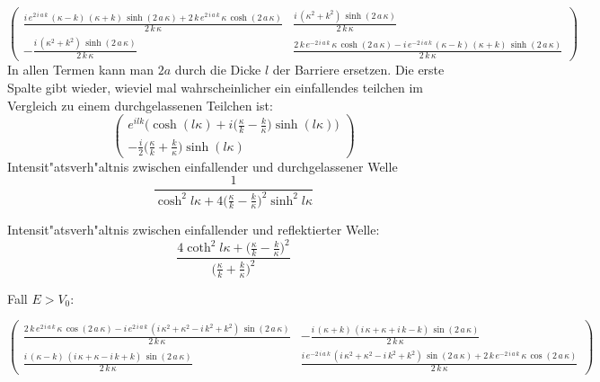 
\[
\begin{pmatrix}
\frac{i\,e^{2\,i\,a\,k}\,\left(\kappa-k\right)\,\left(\kappa+k
 \right)\,\sinh \left(2\,a\,\kappa\right)+2\,k\,e^{2\,i\,a\,k}\,
 \kappa\,\cosh \left(2\,a\,\kappa\right)}{2\,k\,\kappa}
&
\frac{i\,
 \left(\kappa^2+k^2\right)\,\sinh \left(2\,a\,\kappa\right)}{2\,
 k\,\kappa}
\\
-\frac{i\,\left(\kappa^2+k^2\right)\,\sinh \left(2\,a\,
 \kappa\right)}{2\,k\,\kappa}
&
\frac{2\,k\,e^ {- 2\,i\,a\,k }\,
 \kappa\,\cosh \left(2\,a\,\kappa\right)-i\,e^ {- 2\,i\,a\,k }\,
 \left(\kappa-k\right)\,\left(\kappa+k\right)\,\sinh \left(2\,a\,
 \kappa\right)}{2\,k\,\kappa}
\end{pmatrix}
\]
In allen Termen kann man $2a$ durch die Dicke $l$ der Barriere ersetzen.
Die erste Spalte gibt wieder, wieviel mal wahrscheinlicher ein einfallendes
teilchen im Vergleich zu einem durchgelassenen Teilchen ist:
\[
\begin{pmatrix}
\displaystyle
e^{ilk}\biggl(\cosh(l\kappa)
+i\biggl(\frac{\kappa}{k}-\frac{k}{\kappa}\biggr)\sinh(l\kappa)
\biggr)
\\
\displaystyle
- \frac{i}{2}
\biggl(\frac{\kappa}{k}+\frac{k}{\kappa}\biggr)
\sinh(l\kappa)
\end{pmatrix}
\]
Intensit"atsverh"altnis zwischen einfallender und durchgelassener
Welle
\[
\frac{1}{
\displaystyle
\cosh^2 l\kappa 
+
4\biggl(\displaystyle\frac{\kappa}{k}-\frac{k}{\kappa}\biggr)^2\sinh^2l\kappa
}
\]

Intensit"atsverh"altnis zwischen einfallender und reflektierter
Welle:
\[
\frac{
4\coth^2l\kappa + \biggl(\displaystyle\frac{\kappa}{k}-\frac{k}{\kappa}\biggr)^2
}{
\biggl(\displaystyle\frac{\kappa}{k}+\frac{k}{\kappa}\biggr)^2
}
\]

Fall $E>V_0$:

\[
\begin{pmatrix}
\frac{2\,k\,e^{2\,i\,a\,k}\,\kappa\,\cos \left(2\,a\,\kappa
 \right)-i\,e^{2\,i\,a\,k}\,\left(i\,\kappa^2+\kappa^2-i\,k^2+k^2
 \right)\,\sin \left(2\,a\,\kappa\right)}{2\,k\,\kappa}
&
-\frac{i\,
 \left(\kappa+k\right)\,\left(i\,\kappa+\kappa+i\,k-k\right)\,\sin 
 \left(2\,a\,\kappa\right)}{2\,k\,\kappa}
\\
\frac{i\,\left(\kappa-
 k\right)\,\left(i\,\kappa+\kappa-i\,k+k\right)\,\sin \left(2\,a\,
 \kappa\right)}{2\,k\,\kappa}
&
\frac{i\,e^ {- 2\,i\,a\,k }\,\left(i
 \,\kappa^2+\kappa^2-i\,k^2+k^2\right)\,\sin \left(2\,a\,\kappa
 \right)+2\,k\,e^ {- 2\,i\,a\,k }\,\kappa\,\cos \left(2\,a\,\kappa
 \right)}{2\,k\,\kappa}
\end{pmatrix}
\]
